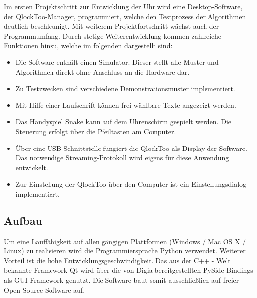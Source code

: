 \begin{multicols}{2}
Im ersten Projektschritt zur Entwicklung der Uhr wird eine Desktop-Software, der QlockToo-Manager, programmiert, welche den Testprozess der Algorithmen deutlich beschleunigt. Mit weiterem Projektfortschritt wächst auch der Programmumfang. Durch stetige Weiterentwicklung kommen zahlreiche Funktionen hinzu, welche im folgenden dargestellt sind:

\begin{itemize}
    \item Die Software enthält einen Simulator. Dieser stellt alle Muster und Algorithmen direkt ohne Anschluss an die Hardware dar.
    \item Zu Testzwecken sind verschiedene Demonstrationsmuster implementiert.
    \item Mit Hilfe einer Laufschrift können frei wählbare Texte angezeigt werden.
    \item Das Handyspiel Snake kann auf dem Uhrenschirm gespielt werden. Die Steuerung erfolgt über die Pfeiltasten am Computer.
    \item Über eine USB-Schnittstelle fungiert die QlockToo als Display der Software. Das notwendige Streaming-Protokoll wird eigens für diese Anwendung entwickelt.
    \item Zur Einstellung der QlockToo über den Computer ist ein Einstellungsdialog implementiert.
\end{itemize}

\subsection*{Aufbau}
Um eine Lauffähigkeit auf allen gängigen Plattformen (Windows / Mac OS X / Linux) zu realisieren wird die Programmiersprache Python verwendet. Weiterer Vorteil ist die hohe Entwicklungsgeschwindigkeit.
Das aus der C++ - Welt bekannte Framework Qt wird über die von Digia bereitgestellten PySide-Bindings als GUI-Framework genutzt. Die Software baut somit ausschließlich auf freier Open-Source Software auf.


\end{multicols}
